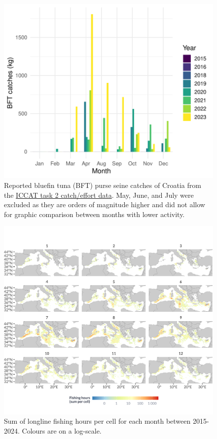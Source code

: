 \begin{figure}[H]
	\centering
	\includegraphics[width=1\linewidth, trim=0 0 0 0,clip]{Figures/plots/hrv_catches.pdf}
	\caption{Reported bluefin tuna (BFT) purse seine catches of Croatia from the \href{https://www.iccat.int/en/accesingdb.html}{ICCAT task 2 catch/effort data}. May, June, and July were excluded as they are orders of magnitude higher and did not
		allow for graphic comparison between months with lower activity.}
	\label{fig:hrv}
\end{figure}

\begin{figure}[H]
	\centering
	\includegraphics[width=1\linewidth, trim=0 1cm 0 1cm,clip]{Figures/plots/dll_monthly.pdf}
	\caption{Sum of longline fishing hours per cell for each month between 2015-2024. Colours are on a log-scale.}
	\label{fig:dll_monthly}
\end{figure}

